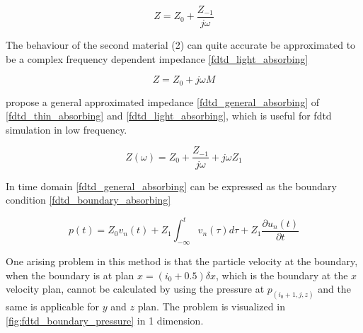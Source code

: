 \begin{equation}\label{fdtd_thin_absorbing}
Z= Z_0+\frac{Z_{-1}}{j\omega}
\end{equation}

         \startexplain
    \stopexplain

The behaviour of the second material (2) can quite accurate be approximated to be a complex frequency dependent impedance \autoref{fdtd_light_absorbing}

\begin{equation}\label{fdtd_light_absorbing}
Z= Z_0+j\omega M
\end{equation}

         \startexplain
    \stopexplain

 \citep{finiteproblems} propose a general approximated impedance \autoref{fdtd_general_absorbing} of \autoref{fdtd_thin_absorbing} and \autoref{fdtd_light_absorbing}, which is useful for \gls{fdtd} simulation in low frequency.

\begin{equation}\label{fdtd_general_absorbing}
Z(\omega)= Z_0+\frac{Z_{-1}}{j\omega}+j\omega Z_1
\end{equation}

         \startexplain
    \stopexplain
    
In time domain \autoref{fdtd_general_absorbing} can be expressed as the boundary condition \autoref{fdtd_boundary_absorbing}

\begin{equation}\label{fdtd_boundary_absorbing}
p(t)= Z_0v_n(t)+Z_1\int_{-\infty}^{t} v_n(\tau)d\tau +Z_1\frac{\partial u_n(t)}{\partial t} 
\end{equation}

         \startexplain
    \stopexplain

One arising problem in this method is that the particle velocity at the boundary, when the boundary is at plan $x=(i_0+0.5)\delta x$, which is the boundary at the $x$ velocity plan, cannot be calculated by using the pressure at $p_{(i_0+1,j,z)}$ and the same is applicable for $y$ and $z$ plan. The problem is visualized in \autoref{fig:fdtd_boundary_pressure} in 1 dimension.

